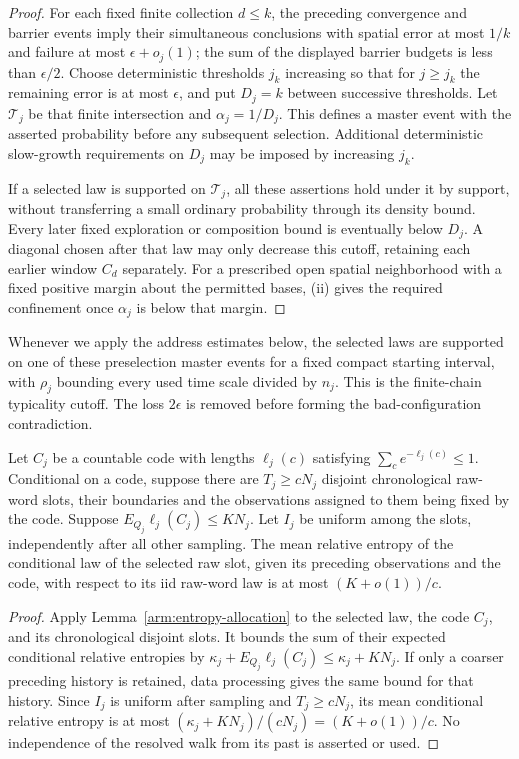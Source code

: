 \begin{proof}
For each fixed finite collection $d\le k$, the preceding convergence
and barrier events imply their simultaneous conclusions with spatial
error at most $1/k$ and failure at most $\epsilon+o_j(1)$; the sum of
the displayed barrier budgets is less than $\epsilon/2$.  Choose
deterministic thresholds $j_k$ increasing so that for $j\ge j_k$ the
remaining error is at most $\epsilon$, and put $D_j=k$ between
successive thresholds.  Let $\mathcal T_j$ be that finite intersection
and $\alpha_j=1/D_j$.  This defines a master event with the asserted
probability before any subsequent selection.  Additional deterministic
slow-growth requirements on $D_j$ may be imposed by increasing $j_k$.

If a selected law is supported on $\mathcal T_j$, all these assertions
hold under it by support, without transferring a small ordinary
probability through its density bound.  Every later fixed exploration
or composition bound is eventually below $D_j$.  A diagonal chosen
after that law may only decrease this cutoff, retaining each earlier
window $C_d$ separately.  For a prescribed open spatial neighborhood
with a fixed positive margin about the permitted bases, (ii) gives
the required confinement once $\alpha_j$ is below that margin.
\end{proof}

Whenever we apply the address estimates below, the selected laws are
supported on one of these preselection master events for a fixed
compact starting interval, with $\rho_j$ bounding every used time
scale divided by $n_j$.  This is the finite-chain typicality cutoff.
The loss $2\epsilon$ is removed before forming the bad-configuration
contradiction.

\begin{lemma}\label{view:entropy-slots}
Let $C_j$ be a countable code with lengths $\ell_j(c)$ satisfying
$\sum_c e^{-\ell_j(c)}\le1$.  Conditional on a code, suppose there are
$T_j\ge cN_j$ disjoint chronological raw-word slots, their boundaries and
the observations assigned to them being fixed by the code.  Suppose
$E_{Q_j}\ell_j(C_j)\le K N_j$.  Let $I_j$ be uniform among the slots,
independently after all other sampling.  The mean relative entropy of the
conditional law of the selected raw slot, given its preceding observations
and the code, with respect to its iid raw-word law is at most
$(K+o(1))/c$.
\end{lemma}

\begin{proof}
Apply Lemma~\ref{arm:entropy-allocation} to the selected law, the
code $C_j$, and its chronological disjoint slots.  It bounds the sum
of their expected conditional relative entropies by
$\kappa_j+E_{Q_j}\ell_j(C_j)\le\kappa_j+KN_j$.
If only a coarser preceding history is retained, data processing
gives the same bound for that history.  Since $I_j$ is uniform after
sampling and $T_j\ge cN_j$, its mean conditional relative entropy is
at most $(\kappa_j+KN_j)/(cN_j)=(K+o(1))/c$.
No independence of the resolved walk from its past is asserted or used.
\end{proof}

